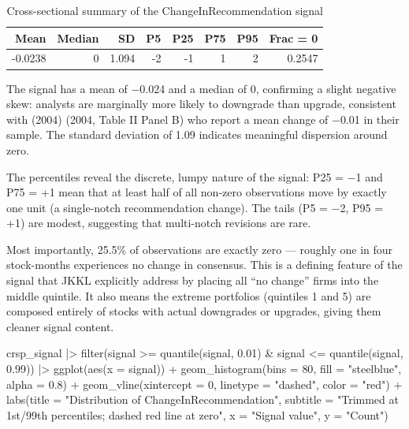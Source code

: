 \documentclass[
  letterpaper,
  DIV=11,
  numbers=noendperiod]{scrartcl}
\newenvironment{Shaded}{\begin{snugshade}}{\end{snugshade}}
\newcommand{\AttributeTok}[1]{\textcolor[rgb]{0.40,0.45,0.13}{#1}}
\newcommand{\DecValTok}[1]{\textcolor[rgb]{0.68,0.00,0.00}{#1}}
\newcommand{\FloatTok}[1]{\textcolor[rgb]{0.68,0.00,0.00}{#1}}
\newcommand{\FunctionTok}[1]{\textcolor[rgb]{0.28,0.35,0.67}{#1}}
\newcommand{\NormalTok}[1]{\textcolor[rgb]{0.00,0.23,0.31}{#1}}
\newcommand{\SpecialCharTok}[1]{\textcolor[rgb]{0.37,0.37,0.37}{#1}}
\newcommand{\StringTok}[1]{\textcolor[rgb]{0.13,0.47,0.30}{#1}}
\begin{document}
\begin{longtable}[t]{rrrrrrrr}
\caption{\label{tab:desc-signal}Cross-sectional summary of the ChangeInRecommendation signal}\\
\toprule
Mean & Median & SD & P5 & P25 & P75 & P95 & Frac = 0\\
\midrule
-0.0238 & 0 & 1.094 & -2 & -1 & 1 & 2 & 0.2547\\
\bottomrule
\end{longtable}

The signal has a mean of −0.024 and a median of 0, confirming a slight
negative skew: analysts are marginally more likely to downgrade than
upgrade, consistent with (2004) (2004, Table II Panel B) who report a
mean change of −0.01 in their sample. The standard deviation of 1.09
indicates meaningful dispersion around zero.

The percentiles reveal the discrete, lumpy nature of the signal: P25 =
−1 and P75 = +1 mean that at least half of all non-zero observations
move by exactly one unit (a single-notch recommendation change). The
tails (P5 = −2, P95 = +1) are modest, suggesting that multi-notch
revisions are rare.

Most importantly, 25.5\% of observations are exactly zero --- roughly
one in four stock-months experiences no change in consensus. This is a
defining feature of the signal that JKKL explicitly address by placing
all ``no change'' firms into the middle quintile. It also means the
extreme portfolios (quintiles 1 and 5) are composed entirely of stocks
with actual downgrades or upgrades, giving them cleaner signal content.

\begin{Shaded}
\begin{Highlighting}[]
\NormalTok{crsp\_signal }\SpecialCharTok{|\textgreater{}}
  \FunctionTok{filter}\NormalTok{(signal }\SpecialCharTok{\textgreater{}=} \FunctionTok{quantile}\NormalTok{(signal, }\FloatTok{0.01}\NormalTok{) }\SpecialCharTok{\&}\NormalTok{ signal }\SpecialCharTok{\textless{}=} \FunctionTok{quantile}\NormalTok{(signal, }\FloatTok{0.99}\NormalTok{)) }\SpecialCharTok{|\textgreater{}}
  \FunctionTok{ggplot}\NormalTok{(}\FunctionTok{aes}\NormalTok{(}\AttributeTok{x =}\NormalTok{ signal)) }\SpecialCharTok{+}
  \FunctionTok{geom\_histogram}\NormalTok{(}\AttributeTok{bins =} \DecValTok{80}\NormalTok{, }\AttributeTok{fill =} \StringTok{"steelblue"}\NormalTok{, }\AttributeTok{alpha =} \FloatTok{0.8}\NormalTok{) }\SpecialCharTok{+}
  \FunctionTok{geom\_vline}\NormalTok{(}\AttributeTok{xintercept =} \DecValTok{0}\NormalTok{, }\AttributeTok{linetype =} \StringTok{"dashed"}\NormalTok{, }\AttributeTok{color =} \StringTok{"red"}\NormalTok{) }\SpecialCharTok{+}
  \FunctionTok{labs}\NormalTok{(}\AttributeTok{title =} \StringTok{"Distribution of ChangeInRecommendation"}\NormalTok{,}
       \AttributeTok{subtitle =} \StringTok{"Trimmed at 1st/99th percentiles; dashed red line at zero"}\NormalTok{,}
       \AttributeTok{x =} \StringTok{"Signal value"}\NormalTok{, }\AttributeTok{y =} \StringTok{"Count"}\NormalTok{)}
\end{Highlighting}
\end{Shaded}
\end{document}
